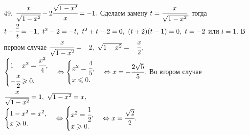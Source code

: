 49. $\cfrac{x}{\sqrt{1-x^2}}-2\cfrac{\sqrt{1-x^2}}{x}=-1.$ Сделаем замену $t=\cfrac{x}{\sqrt{1-x^2}},$ тогда $t-\cfrac{2}{t}=-1,\ t^2-2=-t,\ t^2+t-2=0,\ (t+2)(t-1)=0,\ t=-2$ или $t=1.$ В первом случае $\cfrac{x}{\sqrt{1-x^2}}=-2,\ \sqrt{1-x^2}=-\cfrac{x}{2},$\\$ \begin{cases} 1-x^2=\cfrac{x^2}{4},\\ -\cfrac{x}{2}\geqslant 0.\end{cases}\Leftrightarrow\begin{cases} x^2=\cfrac{4}{5},\\ x\leqslant 0.\end{cases}\Leftrightarrow x=-\cfrac{2\sqrt{5}}{5}.$ Во втором случае $\cfrac{x}{\sqrt{1-x^2}}=1,\ \sqrt{1-x^2}=x,$\\$\begin{cases} 1-x^2=x^2,\\ x\geqslant 0.\end{cases}\Leftrightarrow
\begin{cases} x^2=\cfrac{1}{2},\\ x\geqslant 0.\end{cases}\Leftrightarrow x=\cfrac{\sqrt{2}}{2}.$\\

